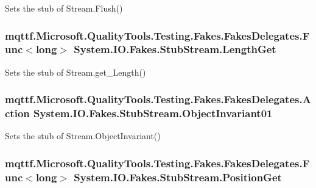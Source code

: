 Sets the stub of Stream.\-Flush()

\hypertarget{class_system_1_1_i_o_1_1_fakes_1_1_stub_stream_a84004248bca69acdff3b626ce53c498f}{
\subsubsection[{Length\-Get}]{\setlength{\rightskip}{0pt plus 5cm}mqttf.\-Microsoft.\-Quality\-Tools.\-Testing.\-Fakes.\-Fakes\-Delegates.\-Func$<$long$>$ System.\-I\-O.\-Fakes.\-Stub\-Stream.\-Length\-Get}}\label{class_system_1_1_i_o_1_1_fakes_1_1_stub_stream_a84004248bca69acdff3b626ce53c498f}


Sets the stub of Stream.\-get\-\_\-\-Length()

\hypertarget{class_system_1_1_i_o_1_1_fakes_1_1_stub_stream_a5fa63d8f762a9da605571724bc206ed6}{
\subsubsection[{Object\-Invariant01}]{\setlength{\rightskip}{0pt plus 5cm}mqttf.\-Microsoft.\-Quality\-Tools.\-Testing.\-Fakes.\-Fakes\-Delegates.\-Action System.\-I\-O.\-Fakes.\-Stub\-Stream.\-Object\-Invariant01}}\label{class_system_1_1_i_o_1_1_fakes_1_1_stub_stream_a5fa63d8f762a9da605571724bc206ed6}


Sets the stub of Stream.\-Object\-Invariant()

\hypertarget{class_system_1_1_i_o_1_1_fakes_1_1_stub_stream_ac33a1d247097596208168af68b401370}{
\subsubsection[{Position\-Get}]{\setlength{\rightskip}{0pt plus 5cm}mqttf.\-Microsoft.\-Quality\-Tools.\-Testing.\-Fakes.\-Fakes\-Delegates.\-Func$<$long$>$ System.\-I\-O.\-Fakes.\-Stub\-Stream.\-Position\-Get}}\label{class_system_1_1_i_o_1_1_fakes_1_1_stub_stream_ac33a1d247097596208168af68b401370}



